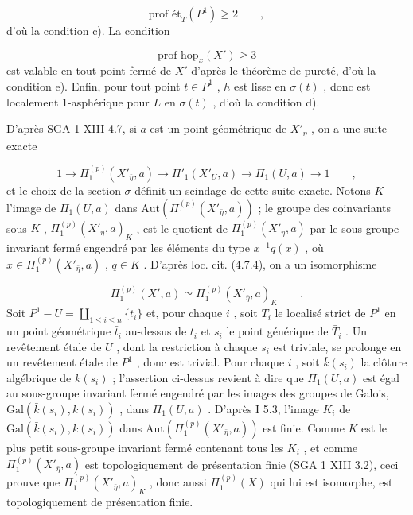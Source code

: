 \begin{equation*}
\text{prof ét}_T(P^1) \geqslant 2 \qquad ,
\end{equation*}
d'où la condition c). La condition

\begin{equation*}
\text{prof hop}_x(X') \geqslant 3
\end{equation*}
est valable en tout point fermé de $X'$ d'après le théorème de pureté, d'où la condition e). Enfin, pour tout point $t \in P^1$ , $h$ est lisse en $\sigma(t)$ , donc est localement 1-asphérique pour $L$ en $\sigma(t)$ , d'où la condition d).

D'après SGA 1 XIII 4.7, si $a$ est un point géométrique de $X'_{\bar{\eta}}$ , on a une suite exacte

\begin{equation*}
1 \longrightarrow \Pi_1^{(p)}(X'_{\bar{\eta}},a) \longrightarrow \Pi'_1(X'_U,a) \longrightarrow \Pi_1(U,a) \longrightarrow 1 \qquad ,
\end{equation*}
et le choix de la section $\sigma$ définit un scindage de cette suite exacte. Notons $K$ l'image de $\Pi_1(U,a)$ dans $\mathrm{Aut}(\Pi_1^{(p)}(X'_{\bar{\eta}},a))$ ; le groupe des coinvariants sous $K$ , $\Pi_1^{(p)}(X'_{\bar{\eta}},a)_K$ , est le quotient de $\Pi_1^{(p)}(X'_{\bar{\eta}},a)$ par le sous-groupe invariant fermé engendré par les éléments du type $x^{-1}q(x)$ , où $x \in \Pi_1^{(p)}(X'_{\bar{\eta}},a)$ , $q \in K$ . D'après loc. cit. (4.7.4), on a un isomorphisme

\begin{equation*}
\Pi_1^{(p)}(X',a) \simeq \Pi_1^{(p)}(X'_{\bar{\eta}},a)_K \qquad .
\end{equation*}
Soit $P^1 - U = \coprod_{1\leqslant i\leqslant n} \{t_i\}$ et, pour chaque $i$ , soit $\bar{T}_i$ le localisé strict de $P^1$ en un point géométrique $\bar{t}_i$ au-dessus de $t_i$ et $s_i$ le point générique de $\bar{T}_i$ . Un revêtement étale de $U$ , dont la restriction à chaque $s_i$ est triviale, se prolonge en un revêtement étale de $P^1$ , donc est trivial. Pour chaque $i$ , soit $\bar{k}(s_i)$ la clôture algébrique de $k(s_i)$ ; l'assertion ci-dessus revient à dire que $\Pi_1(U,a)$ est égal au sous-groupe invariant fermé engendré par les images des groupes de Galois, $\mathrm{Gal}(\bar{k}(s_i),k(s_i))$ , dans $\Pi_1(U,a)$ . D'après I 5.3, l'image $K_i$ de $\mathrm{Gal}(\bar{k}(s_i),k(s_i))$ dans $\mathrm{Aut}(\Pi_1^{(p)}(X'_{\bar{\eta}},a))$ est finie. Comme $K$ est le plus petit sous-groupe invariant fermé contenant tous les $K_i$ , et comme $\Pi_1^{(p)}(X'_{\bar{\eta}},a)$ est topologiquement de présentation finie (SGA 1 XIII 3.2), ceci prouve que $\Pi_1^{(p)}(X'_{\bar{\eta}},a)_K$ , donc aussi $\Pi_1^{(p)}(X)$ qui lui est isomorphe, est topologiquement de présentation finie.


